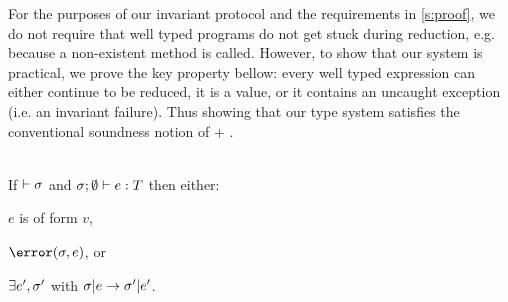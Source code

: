 For the purposes of our invariant protocol and the requirements in \autoref{s:proof}, we do not require that well typed programs do not get stuck during reduction, e.g. because a non-existent method is called.
However, to show that our system is practical, we prove the key property bellow:
every well typed expression can either continue to be reduced, it is a value, or it contains an uncaught exception (i.e. an invariant failure).
Thus showing that our type system satisfies the conventional soundness notion of  + .

\SS\begin{theorem}[Progress]\ \\
	\indent If $\vdash \sigma$ and $\tyr{e}{T}$ then either:
	\begin{iitemize}
		\item $e$ is of form $v$,\SS
		\item $\error(\s, e)$, or\SS
		\item $\exists e',\sigma'$ with $\sigma|e \rightarrow \sigma'|e'$.
	\end{iitemize}
\end{theorem}
